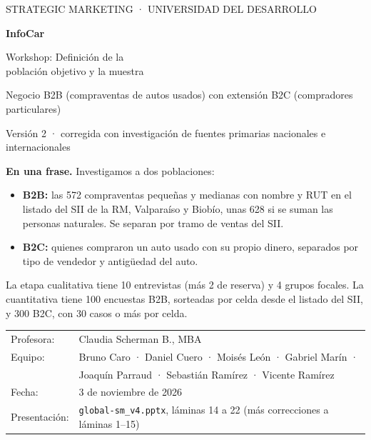 \documentclass[11pt,a4paper]{article}
\begin{document}
\begin{titlepage}
\vspace*{1.2cm}
{\sffamily\small\color{cobalt}STRATEGIC MARKETING · UNIVERSIDAD DEL DESARROLLO\par}
\vspace{0.6cm}
{\sffamily\fontsize{34}{40}\selectfont\bfseries\color{ink} InfoCar\par}
\vspace{0.3cm}
{\sffamily\fontsize{20}{26}\selectfont\color{ink} Workshop: Definición de la\\ población objetivo y la muestra\par}
\vspace{0.5cm}
{\large Negocio B2B (compraventas de autos usados) con extensión B2C (compradores particulares)\par}
\vspace{0.3cm}
{\sffamily\small\color{cobalt}Versión 2 · corregida con investigación de fuentes primarias nacionales e internacionales\par}
\vspace{1cm}
\begin{keybox}
\textbf{En una frase.} Investigamos a dos poblaciones:
\begin{itemize}
\item \textbf{B2B:} las 572 compraventas pequeñas y medianas con nombre y RUT en el listado del SII de la RM, Valparaíso y Biobío, unas 628 si se suman las personas naturales. Se separan por tramo de ventas del SII.
\item \textbf{B2C:} quienes compraron un auto usado con su propio dinero, separados por tipo de vendedor y antigüedad del auto.
\end{itemize}
La etapa cualitativa tiene 10 entrevistas (más 2 de reserva) y 4 grupos focales. La cuantitativa tiene 100 encuestas B2B, sorteadas por celda desde el listado del SII, y 300 B2C, con 30 casos o más por celda.
\end{keybox}
\vfill
{\sffamily\small
\begin{tabular}{@{}ll}
Profesora: & Claudia Scherman B., MBA\\
Equipo: & Bruno Caro · Daniel Cuero · Moisés León · Gabriel Marín ·\\
 & Joaquín Parraud · Sebastián Ramírez · Vicente Ramírez\\
Fecha: & 3 de noviembre de 2026\\
Presentación: & \texttt{global-sm\_v4.pptx}, láminas 14 a 22 (más correcciones a láminas 1–15)\\
\end{tabular}\par}
\end{titlepage}
\end{document}
